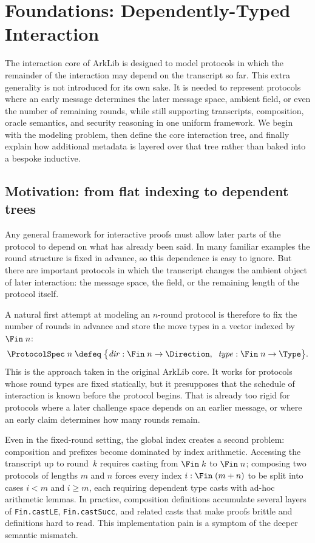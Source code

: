 
\section{Foundations: Dependently-Typed Interaction}\label{sec:interaction-foundations}

The interaction core of ArkLib is designed to model protocols in which the
remainder of the interaction may depend on the transcript so far.  This extra
generality is not introduced for its own sake.  It is needed to represent
protocols where an early message determines the later message space, ambient
field, or even the number of remaining rounds, while still supporting
transcripts, composition, oracle semantics, and security reasoning in one
uniform framework.  We begin with the modeling problem, then define the core
interaction tree, and finally explain how additional metadata is layered over
that tree rather than baked into a bespoke inductive.

\subsection{Motivation: from flat indexing to dependent trees}

Any general framework for interactive proofs must allow later parts of the
protocol to depend on what has already been said.  In many familiar examples the
round structure is fixed in advance, so this dependence is easy to ignore.  But
there are important protocols in which the transcript changes the ambient object
of later interaction: the message space, the field, or the remaining length of
the protocol itself.

A natural first attempt at modeling an $n$-round protocol is therefore to fix
the number of rounds in advance and store the move types in a vector indexed by
$\Fin\;n$:
%
\[
  \ProtocolSpec\;n \;\defeq\;
    \bigl\{
      \mathit{dir} : \Fin\;n \to \Direction,\;\;
      \mathit{type} : \Fin\;n \to \Type
    \bigr\}.
\]
%
This is the approach taken in the original ArkLib core.  It works for protocols
whose round types are fixed statically, but it presupposes that the schedule of
interaction is known before the protocol begins.  That is already too rigid for
protocols where a later challenge space depends on an earlier message, or where
an early claim determines how many rounds remain.

Even in the fixed-round setting, the global index creates a second problem:
composition and prefixes become dominated by index arithmetic.  Accessing the
transcript up to round~$k$ requires casting from $\Fin\;k$ to $\Fin\;n$;
composing two protocols of lengths $m$ and $n$ forces every index
$i : \Fin\;(m+n)$ to be split into cases $i < m$ and $i \ge m$, each requiring
dependent type casts with ad-hoc arithmetic lemmas.  In practice, composition
definitions accumulate several layers of \texttt{Fin.castLE},
\texttt{Fin.castSucc}, and related casts that make proofs brittle and
definitions hard to read.  This implementation pain is a symptom of the deeper
semantic mismatch.

